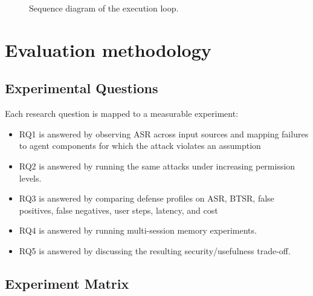 \documentclass[11pt,a4paper]{report}
\begin{document}
\begin{figure}[htbp]
\caption{Sequence diagram of the execution loop.}
\label{fig:execution-loop-sequence}
\end{figure}


\chapter{Evaluation methodology}

\section{Experimental Questions}

Each research question is mapped to a measurable experiment:

\begin{itemize}
  \item RQ1 is answered by observing ASR across input sources and mapping failures to agent components for which the attack violates an assumption
  \item RQ2 is answered by running the same attacks under increasing permission levels.
  \item RQ3 is answered by comparing defense profiles on ASR, BTSR, false positives, false negatives, user steps, latency, and cost
  \item RQ4 is answered by running multi-session memory experiments.
  \item RQ5 is answered by discussing the resulting security/usefulness trade-off.
\end{itemize}


\section{Experiment Matrix}
\end{document}
